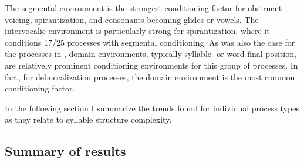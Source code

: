 \begin{table}
\caption{\label{tab:7.6}Conditioning environments for allophonic processes resulting in spirantization, debuccalization, and consonants becoming glides or vowels.}
\end{table}

  The segmental environment is the strongest conditioning factor for obstruent voicing, spirantization, and consonants becoming glides or vowels. The intervocalic environment is particularly strong for spirantization, where it conditions 17/25 processes with segmental conditioning. As was also the case for the processes in , domain environments, typically syllable- or word-final position, are relatively prominent conditioning environments for this group of processes. In fact, for debuccalization processes, the domain environment is the most common conditioning factor.

  In the following section I summarize the trends found for individual process types as they relate to syllable structure complexity.

\subsection{Summary of results} \label{sec:7.3.7}

